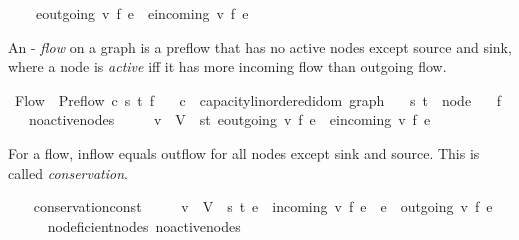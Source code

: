 \begin{isabellebody}
\ \ \ \ {\isacharparenleft}{\isasymSum}e{\isasymin}outgoing\ v{\isachardot}\ f\ e{\isacharparenright}\ {\isasymle}\ {\isacharparenleft}{\isasymSum}e{\isasymin}incoming\ v{\isachardot}\ f\ e{\isacharparenright}{\isachardoublequoteclose}\ \isanewline
{}\isanewline
{}\isamarkupfalse%
%
\begin{isamarkuptext}%
An - \emph{flow} on a graph is a preflow that has no active nodes except 
  source and sink, where a node is \emph{active} iff it has more incoming flow 
  than outgoing flow.%
\end{isamarkuptext}\isamarkuptrue%
\isamarkupfalse%
\ Flow\ {\isacharequal}\ Preflow\ c\ s\ t\ f\isanewline
\ \ \ c\ {\isacharcolon}{\isacharcolon}\ {\isachardoublequoteopen}{\isacharprime}capacity{\isacharcolon}{\isacharcolon}linordered{\isacharunderscore}idom\ graph{\isachardoublequoteclose}\isanewline
\ \ \ s\ t\ {\isacharcolon}{\isacharcolon}\ node\isanewline
\ \ \ f\ {\isacharplus}\isanewline
\ \ \ no{\isacharunderscore}active{\isacharunderscore}nodes{\isacharcolon}\ \isanewline
\ \ \ \ {\isachardoublequoteopen}{\isasymforall}v\ {\isasymin}\ V\ {\isacharminus}\ {\isacharbraceleft}s{\isacharcomma}t{\isacharbraceright}{\isachardot}\ {\isacharparenleft}{\isasymSum}e{\isasymin}outgoing\ v{\isachardot}\ f\ e{\isacharparenright}\ {\isasymge}\ {\isacharparenleft}{\isasymSum}e{\isasymin}incoming\ v{\isachardot}\ f\ e{\isacharparenright}{\isachardoublequoteclose}\isanewline
{}%
\begin{isamarkuptext}%
For a flow, inflow equals outflow for all nodes except sink and source.
    This is called \emph{conservation}.%
\end{isamarkuptext}\isamarkuptrue%
\ \ \isamarkupfalse%
\ conservation{\isacharunderscore}const{\isacharcolon}\ \isanewline
\ \ \ \ {\isachardoublequoteopen}{\isasymforall}v\ {\isasymin}\ V\ {\isacharminus}\ {\isacharbraceleft}s{\isacharcomma}\ t{\isacharbraceright}{\isachardot}\ {\isacharparenleft}{\isasymSum}e\ {\isasymin}\ incoming\ v{\isachardot}\ f\ e{\isacharparenright}\ {\isacharequal}\ {\isacharparenleft}{\isasymSum}e\ {\isasymin}\ outgoing\ v{\isachardot}\ f\ e{\isacharparenright}{\isachardoublequoteclose}\isanewline
%
\isadelimproof
\ \ \ \ %
\endisadelimproof
%
\isatagproof
{}\isamarkupfalse%
\ no{\isacharunderscore}deficient{\isacharunderscore}nodes\ no{\isacharunderscore}active{\isacharunderscore}nodes\ \isanewline
\ \ \ \ \isamarkupfalse%

\end{isabellebody}
